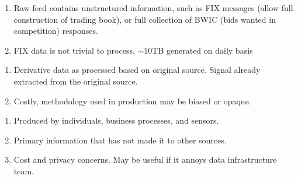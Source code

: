 \begin{remark} 
\begin{enumerate}[label=\roman*.]
\setlength{\itemsep}{0pt}
\item Raw feed contains unstructured information, such as FIX messages (allow full construction of trading book), or full collection of BWIC (bids wanted in competition) responses.
\item FIX data is not trivial to process, $\sim 10$TB generated on daily basis
\end{enumerate}
\end{remark}

\begin{remark} 
\begin{enumerate}[label=\roman*.]
\setlength{\itemsep}{0pt}
\item Derivative data as processed based on original source. Signal already extracted from the original source.
\item Costly, methodology used in production may be biased or opaque.
\end{enumerate}
\end{remark}

\begin{remark} 
\begin{enumerate}[label=\roman*.]
\setlength{\itemsep}{0pt}
\item Produced by individuals, business processes, and sensors.
\item Primary information that has not made it to other sources.
\item Cost and privacy concerns. May be useful if it annoys data infrastructure team.
\end{enumerate}
\end{remark}


